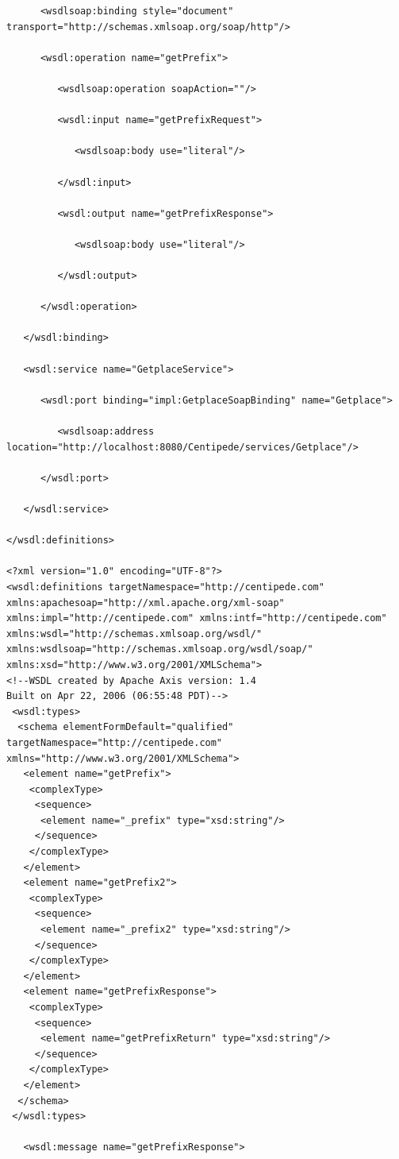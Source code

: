 \documentclass[conference]{IEEEtran}
\begin{document}
\begin{verbatim}
      <wsdlsoap:binding style="document" transport="http://schemas.xmlsoap.org/soap/http"/>

      <wsdl:operation name="getPrefix">

         <wsdlsoap:operation soapAction=""/>

         <wsdl:input name="getPrefixRequest">

            <wsdlsoap:body use="literal"/>

         </wsdl:input>

         <wsdl:output name="getPrefixResponse">

            <wsdlsoap:body use="literal"/>

         </wsdl:output>

      </wsdl:operation>

   </wsdl:binding>

   <wsdl:service name="GetplaceService">

      <wsdl:port binding="impl:GetplaceSoapBinding" name="Getplace">

         <wsdlsoap:address location="http://localhost:8080/Centipede/services/Getplace"/>

      </wsdl:port>

   </wsdl:service>

</wsdl:definitions>

<?xml version="1.0" encoding="UTF-8"?>
<wsdl:definitions targetNamespace="http://centipede.com" xmlns:apachesoap="http://xml.apache.org/xml-soap" xmlns:impl="http://centipede.com" xmlns:intf="http://centipede.com" xmlns:wsdl="http://schemas.xmlsoap.org/wsdl/" xmlns:wsdlsoap="http://schemas.xmlsoap.org/wsdl/soap/" xmlns:xsd="http://www.w3.org/2001/XMLSchema">
<!--WSDL created by Apache Axis version: 1.4
Built on Apr 22, 2006 (06:55:48 PDT)-->
 <wsdl:types>
  <schema elementFormDefault="qualified" targetNamespace="http://centipede.com" xmlns="http://www.w3.org/2001/XMLSchema">
   <element name="getPrefix">
    <complexType>
     <sequence>
      <element name="_prefix" type="xsd:string"/>
     </sequence>
    </complexType>
   </element>
   <element name="getPrefix2">
    <complexType>
     <sequence>
      <element name="_prefix2" type="xsd:string"/>
     </sequence>
    </complexType>
   </element>
   <element name="getPrefixResponse">
    <complexType>
     <sequence>
      <element name="getPrefixReturn" type="xsd:string"/>
     </sequence>
    </complexType>
   </element>
  </schema>
 </wsdl:types>

   <wsdl:message name="getPrefixResponse">


\end{verbatim}
\end{document}
